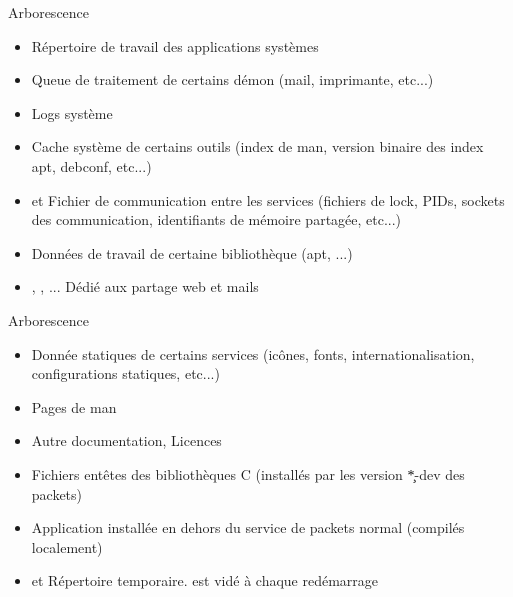 \begin{frame}[fragile=singleslide]{Arborescence}
  \begin{itemize}
  \item {} Répertoire de travail des applications systèmes
  \item {} Queue de traitement de certains démon (mail,
    imprimante, etc...)
  \item {} Logs système
  \item {}  Cache système de certains  outils (index de
    man, version binaire des index apt, debconf, etc...)
  \item {} et   Fichier de communication entre
    les services  (fichiers de lock, PIDs,  sockets des communication,
    identifiants de mémoire partagée, etc...)
  \item  {} Données de  travail de  certaine bibliothèque
    (apt, ...)
  \item {}, ,  ...  Dédié aux partage web
    et mails
  \end{itemize}
\end{frame}

\begin{frame}[fragile=singleslide]{Arborescence}
  \begin{itemize}
  \item  {}  Donnée   statiques  de  certains  services
    (icônes,  fonts,  internationalisation, configurations  statiques,
    etc...)
  \item {} Pages de man
  \item {} Autre documentation, Licences
  \item  {}  Fichiers  entêtes  des  bibliothèques  C
    (installés par les version \c{*-dev} des packets)
  \item {}   Application installée en dehors
    du service de packets normal (compilés localement)
  \item      {}       et            Répertoire
    temporaire.  est vidé à chaque redémarrage
  \end{itemize}
\end{frame}

